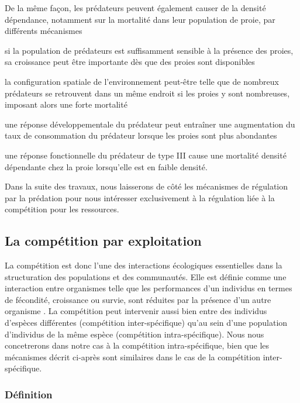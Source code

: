 De la même façon, les prédateurs peuvent également causer de la densité
dépendance, notamment sur la mortalité dans leur population de proie, par
différents mécanismes \autocite{taylor1984a} \begin{enumerate*}[label=(\roman*), before=\unskip{ : }, itemjoin={{ ; }},
itemjoin*={{ ; et }}] \item si la population de prédateurs est suffisamment
sensible à la présence des proies, sa croissance peut être importante dès que
des proies sont disponibles \item la configuration spatiale de l'environnement
peut-être telle que de nombreux prédateurs se retrouvent dans un même endroit si
les proies y sont nombreuses, imposant alors une forte mortalité \item une
réponse développementale du prédateur peut entraîner une augmentation du taux de
consommation du prédateur lorsque les proies sont plus abondantes \item une
réponse fonctionnelle du prédateur de type III \autocite{holling1965a} cause une
mortalité densité dépendante chez la proie lorsqu'elle est en faible densité.
\end{enumerate*}

Dans la suite des travaux, nous laisserons de côté les mécanismes de régulation
par la prédation pour nous intéresser exclusivement à la régulation liée à la
compétition pour les ressources. 

\subsection{La compétition par exploitation}

La compétition est donc l'une des interactions écologiques essentielles dans la
structuration des populations et des communautés. Elle est définie comme une
interaction entre organismes telle que les performances d'un individus en termes
de fécondité, croissance ou survie, sont réduites par la présence d'un autre
organisme \autocite{volterra1931a, gause1932a, park1948a, park1954a, park1957a}.
La compétition peut intervenir aussi bien entre des individus d'espèces
différentes (compétition inter-spécifique) qu'au sein d'une population
d'individus de la même espèce (compétition intra-spécifique). Nous nous
concetrerons dans notre cas à la compétition intra-spécifique, bien que les
mécanismes décrit ci-après sont similaires dans le cas de la compétition
inter-spécifique. 

\subsubsection{Définition}

